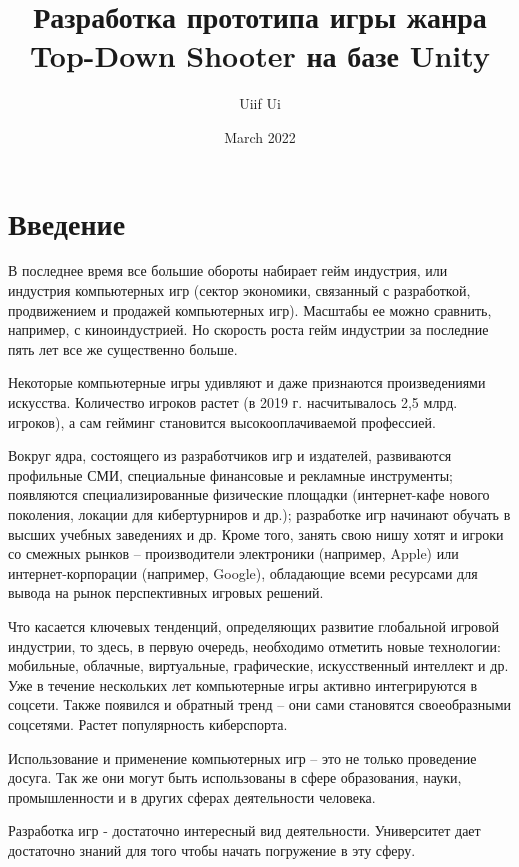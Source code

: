 \documentclass[14pt, titlepage,fleqn,a4paper]{extarticle}
\title{Разработка прототипа игры жанра Top-Down Shooter на базе Unity}
\author{Uiif Ui}
\date{March 2022}
\begin{document}
    \maketitle
	\tableofcontents   
	\setcounter{page}{1}
	\newpage
	\section*{Введение}
В последнее время все большие обороты набирает гейм индустрия, или индустрия компьютерных игр (сектор экономики, связанный с разработкой, продвижением и продажей компьютерных игр). Масштабы ее можно сравнить, например, с киноиндустрией. Но скорость роста гейм индустрии за последние пять лет все же существенно больше.

Некоторые компьютерные игры удивляют и даже признаются произведениями искусства. Количество игроков растет (в 2019 г. насчитывалось 2,5 млрд. игроков), а сам гейминг становится высокооплачиваемой профессией. 

Вокруг ядра, состоящего из разработчиков игр и издателей, развиваются профильные СМИ, специальные финансовые и рекламные инструменты; появляются специализированные физические площадки (интернет-кафе нового поколения, локации для кибертурниров и др.); разработке игр начинают обучать в высших учебных заведениях и др. Кроме того, занять свою нишу хотят и игроки со смежных рынков – производители электроники (например, Apple) или интернет-корпорации (например, Google), обладающие всеми ресурсами для вывода на рынок перспективных игровых решений.

Что касается ключевых тенденций, определяющих развитие глобальной игровой индустрии, то здесь, в первую очередь, необходимо отметить новые технологии: мобильные, облачные, виртуальные, графические, искусственный интеллект и др. Уже в течение нескольких лет компьютерные игры активно интегрируются в соцсети. Также появился и обратный тренд – они сами становятся своеобразными соцсетями. Растет популярность киберспорта.

Использование и применение компьютерных игр – это не только проведение досуга. Так же они могут быть использованы в сфере образования, науки, промышленности и в других сферах деятельности человека. 

Разработка игр - достаточно интересный вид деятельности. Университет дает достаточно знаний для того чтобы начать погружение в эту сферу.
\end{document}
